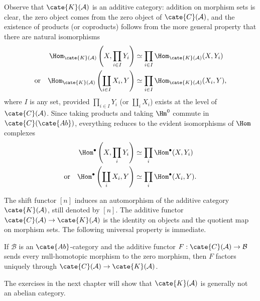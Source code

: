 Observe that $\cate{K}(\mathcal{A})$ is an additive category: addition on
morphism sets is clear, the zero object comes from the zero object of
$\cate{C}(\mathcal{A})$, and the existence of products (or coproducts) follows
from the more general property that there are natural isomorphisms
\begin{align*}
	\Hom_{\cate{K}(\mathcal{A})}\left( X, \prod_{i \in I} Y_i \right) & \simeq \prod_{i \in I} \Hom_{\cate{K}(\mathcal{A})}(X, Y_i) \\
	\text{or}\quad \Hom_{\cate{K}(\mathcal{A})}\left( \coprod_{i \in I} X_i, Y \right) & \simeq \prod_{i \in I} \Hom_{\cate{K}(\mathcal{A})}(X_i, Y),
\end{align*}
where $I$ is any set, provided $\prod_{i\in I}Y_i$ (or $\coprod_iX_i$)
exists at the level of $\cate{C}(\mathcal{A})$. Since taking products and
taking $\Hm^0$ commute in $\cate{C}(\cate{Ab})$, everything reduces to the
evident isomorphisms of $\Hom$ complexes
\begin{align*}
	\Hom^\bullet\left(X, \prod_i Y_i\right) & \simeq \prod_i \Hom^\bullet(X, Y_i) \\
	\text{or}\quad \Hom^\bullet\left(\coprod_i X_i, Y\right) & \simeq \prod_i \Hom^\bullet(X_i, Y).
\end{align*}

The shift functor $[n]$ induces an automorphism of the additive category
$\cate{K}(\mathcal{A})$, still denoted by $[n]$. The additive functor
$\cate{C}(\mathcal{A})\to\cate{K}(\mathcal{A})$ is the identity on objects
and the quotient map on morphism sets. The following universal property is
immediate.

\begin{proposition}\label{prop:homotopy-category-universal-property}
	If $\mathcal{B}$ is an $\cate{Ab}$-category and the additive functor
	$F:\cate{C}(\mathcal{A})\to\mathcal{B}$ sends every null-homotopic
	morphism to the zero morphism, then $F$ factors uniquely through
	$\cate{C}(\mathcal{A})\to\cate{K}(\mathcal{A})$.
\end{proposition}

The exercises in the next chapter will show that $\cate{K}(\mathcal{A})$ is
generally not an abelian category.

